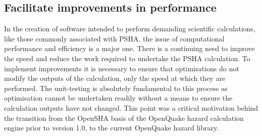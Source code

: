 \subsection{Facilitate improvements in performance}
In the creation of software intended to perform demanding scientific calculations, like those commonly associated with PSHA, the issue of computational performance and efficiency is a major one. There is a continuing need to improve the speed and reduce the work required to undertake the PSHA calculation. To implement improvements it is necessary to ensure that optimisations do not modify the outputs of the calculation, only the speed at which they are performed. The unit-testing is absolutely fundamental to this process as optimisation cannot be undertaken readily without a means to ensure the calculation outputs have not changed. This point was a critical motivation behind the transition from the OpenSHA basis of the OpenQuake hazard calculation engine prior to version 1.0, to the current OpenQuake hazard library.
